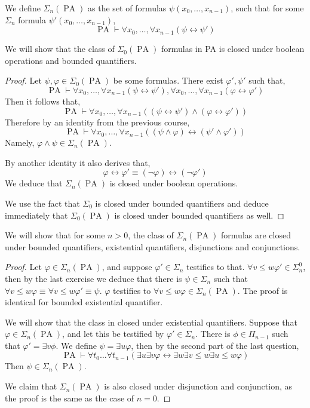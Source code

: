 \question{}
We define $\Sigma_n(\operatorname{PA})$ as the set of formulas $\psi(x_0, \ldots, x_{n - 1})$, such that for some $\Sigma_n$ formula $\psi'(x_0, \ldots, x_{n - 1})$,
\[
	\operatorname{PA}
	\vdash \forall x_0, \ldots, \forall x_{n - 1} (\psi \leftrightarrow \psi')
\]

\subquestion{}
We will show that the class of $\Sigma_0 (\operatorname{PA})$ formulas in PA is closed under boolean operations and bounded quantifiers.
\begin{proof}
	Let $\psi, \varphi \in \Sigma_0(\operatorname{PA})$ be some formulas.
	There exist $\varphi', \psi'$ such that,
	\[
		\operatorname{PA}
		\vdash \forall x_0, \ldots, \forall x_{n - 1} (\psi \leftrightarrow \psi'),
		\forall x_0, \ldots, \forall x_{n - 1} (\varphi \leftrightarrow \varphi')
	\]
	Then it follows that,
	\[
		\operatorname{PA}
		\vdash \forall x_0, \ldots, \forall x_{n - 1} ((\psi \leftrightarrow \psi') \land (\varphi \leftrightarrow \varphi'))
	\]
	Therefore by an identity from the previous course,
	\[
		\operatorname{PA}
		\vdash \forall x_0, \ldots, \forall x_{n - 1} ((\psi \land \varphi) \leftrightarrow (\psi' \land \varphi'))
	\]
	Namely, $\varphi \land \psi \in \Sigma_n(\operatorname{PA})$.

	By another identity it also derives that,
	\[
		\varphi \leftrightarrow \varphi' \equiv (\lnot \varphi) \leftrightarrow (\lnot \varphi')
	\]
	We deduce that $\Sigma_n(\operatorname{PA})$ is closed under boolean operations.

	We use the fact that $\Sigma_0$ is closed under bounded quantifiers and deduce immediately that $\Sigma_0(\operatorname{PA})$ is closed under bounded quantifiers as well.
\end{proof}

\subquestion{}
We will show that for some $n > 0$, the class of $\Sigma_n (\operatorname{PA})$ formulas are closed under bounded quantifiers, existential quantifiers, disjunctions and conjunctions.
\begin{proof}
	Let $\varphi \in \Sigma_n(\operatorname{PA})$, and suppose $\varphi' \in \Sigma_n$ testifies to that.
	$\forall v \le w \varphi' \in \Sigma_n^0$, then by the last exercise we deduce that there is $\psi \in \Sigma_n$ such that $\forall v \le w \varphi \equiv \forall v \le w \varphi' \equiv \psi$.
	$\varphi$ testifies to $\forall v \le w \varphi \in \Sigma_n(\operatorname{PA})$.
	The proof is identical for bounded existential quantifier.

	We will show that the class in closed under existential quantifiers.
	Suppose that $\varphi \in \Sigma_n(\operatorname{PA})$, and let this be testified by $\varphi' \in \Sigma_n$.
	There is $\phi \in \Pi_{n - 1}$ such that $\varphi' = \exists v \phi$.
	We define $\psi = \exists u \varphi$, then by the second part of the last question,
	\[
		\operatorname{PA}
		\vdash \forall t_0 \ldots \forall t_{n - 1} (\exists u \exists v \varphi \leftrightarrow \exists w \exists v \le w \exists u \le w \varphi)
	\]
	Then $\psi \in \Sigma_n(\operatorname{PA})$.

	We claim that $\Sigma_n(\operatorname{PA})$ is also closed under disjunction and conjunction,
	as the proof is the same as the case of $n = 0$.
\end{proof}

